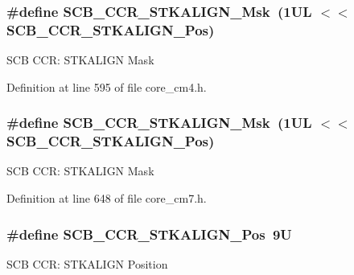\subsubsection[{\texorpdfstring{S\+C\+B\+\_\+\+C\+C\+R\+\_\+\+S\+T\+K\+A\+L\+I\+G\+N\+\_\+\+Msk}{SCB_CCR_STKALIGN_Msk}}]{\setlength{\rightskip}{0pt plus 5cm}\#define S\+C\+B\+\_\+\+C\+C\+R\+\_\+\+S\+T\+K\+A\+L\+I\+G\+N\+\_\+\+Msk~(1\+U\+L $<$$<$ S\+C\+B\+\_\+\+C\+C\+R\+\_\+\+S\+T\+K\+A\+L\+I\+G\+N\+\_\+\+Pos)}\hypertarget{group___c_m_s_i_s___s_c_b_ga33cf22d3d46af158a03aad25ddea1bcb}{}\label{group___c_m_s_i_s___s_c_b_ga33cf22d3d46af158a03aad25ddea1bcb}
S\+CB C\+CR\+: S\+T\+K\+A\+L\+I\+GN Mask 

Definition at line 595 of file core\+\_\+cm4.\+h.

\subsubsection[{\texorpdfstring{S\+C\+B\+\_\+\+C\+C\+R\+\_\+\+S\+T\+K\+A\+L\+I\+G\+N\+\_\+\+Msk}{SCB_CCR_STKALIGN_Msk}}]{\setlength{\rightskip}{0pt plus 5cm}\#define S\+C\+B\+\_\+\+C\+C\+R\+\_\+\+S\+T\+K\+A\+L\+I\+G\+N\+\_\+\+Msk~(1\+U\+L $<$$<$ S\+C\+B\+\_\+\+C\+C\+R\+\_\+\+S\+T\+K\+A\+L\+I\+G\+N\+\_\+\+Pos)}\hypertarget{group___c_m_s_i_s___s_c_b_ga33cf22d3d46af158a03aad25ddea1bcb}{}\label{group___c_m_s_i_s___s_c_b_ga33cf22d3d46af158a03aad25ddea1bcb}
S\+CB C\+CR\+: S\+T\+K\+A\+L\+I\+GN Mask 

Definition at line 648 of file core\+\_\+cm7.\+h.

\subsubsection[{\texorpdfstring{S\+C\+B\+\_\+\+C\+C\+R\+\_\+\+S\+T\+K\+A\+L\+I\+G\+N\+\_\+\+Pos}{SCB_CCR_STKALIGN_Pos}}]{\setlength{\rightskip}{0pt plus 5cm}\#define S\+C\+B\+\_\+\+C\+C\+R\+\_\+\+S\+T\+K\+A\+L\+I\+G\+N\+\_\+\+Pos~9U}\hypertarget{group___c_m_s_i_s___s_c_b_gac2d20a250960a432cc74da59d20e2f86}{}\label{group___c_m_s_i_s___s_c_b_gac2d20a250960a432cc74da59d20e2f86}
S\+CB C\+CR\+: S\+T\+K\+A\+L\+I\+GN Position 

